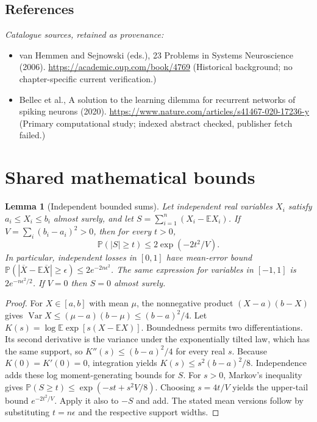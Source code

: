 \documentclass[11pt]{article}
\newcommand{\E}{\mathbb E}
\newcommand{\Prob}{\mathbb P}
\DeclareMathOperator{\Var}{Var}
\providecommand{\E}{\mathbb E}
\providecommand{\Prob}{\mathbb P}
\providecommand{\Var}{\operatorname{Var}}
\newtheorem{sharedlemma}{Lemma}[section]
\begin{document}
\subsection{References}
\noindent\emph{Catalogue sources, retained as provenance:}
\begin{itemize}
\item van Hemmen and Sejnowski (eds.), 23 Problems in Systems Neuroscience (2006). \url{https://academic.oup.com/book/4769} (Historical background; no chapter-specific current verification.)
\item Bellec et al., A solution to the learning dilemma for recurrent networks of spiking neurons (2020). \url{https://www.nature.com/articles/s41467-020-17236-y} (Primary computational study; indexed abstract checked, publisher fetch failed.)
\end{itemize}
\clearpage


\appendix
\section{Shared mathematical bounds}\label{app:bounds}
\begin{sharedlemma}[Independent bounded sums]\label{lem:bounded}
Let independent real variables $X_i$ satisfy $a_i\leq X_i\leq b_i$ almost surely,
and let $S=\sum_{i=1}^n(X_i-\E X_i)$. If
$V=\sum_i(b_i-a_i)^2>0$, then for every $t>0$,
\[
 \Prob(|S|\geq t)\leq 2\exp(-2t^2/V).
\]
In particular, independent losses in $[0,1]$ have mean-error bound
$\Prob(|\overline X-\E\overline X|\geq\epsilon)
\leq2e^{-2n\epsilon^2}$. The same expression for variables in $[-1,1]$
is $2e^{-n\epsilon^2/2}$. If $V=0$ then $S=0$ almost surely.
\end{sharedlemma}
\begin{proof}
For $X\in[a,b]$ with mean $\mu$, the nonnegative product
$(X-a)(b-X)$ gives
$\Var X\leq(\mu-a)(b-\mu)\leq(b-a)^2/4$.
Let $K(s)=\log\E\exp[s(X-\E X)]$.
Boundedness permits two differentiations. Its second derivative is the variance
under the exponentially tilted law, which has the same support, so
$K''(s)\leq(b-a)^2/4$ for every real $s$.
Because $K(0)=K'(0)=0$, integration yields
$K(s)\leq s^2(b-a)^2/8$.
Independence adds these log moment-generating bounds for $S$.
For $s>0$, Markov's inequality gives
$\Prob(S\geq t)\leq\exp(-st+s^2V/8)$.
Choosing $s=4t/V$ yields the upper-tail bound $e^{-2t^2/V}$.
Apply it also to $-S$ and add. The stated mean versions follow by substituting
$t=n\epsilon$ and the respective support widths.
\end{proof}
\end{document}
